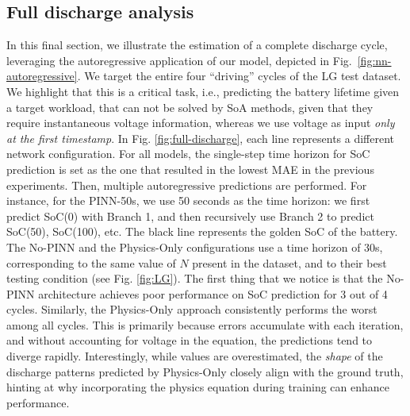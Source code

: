 \subsection{Full discharge analysis}
In this final section, we illustrate the estimation of a complete discharge cycle, leveraging the autoregressive application of our model, depicted in Fig.~\ref{fig:nn-autoregressive}. We target the entire four ``driving'' cycles of the LG test dataset. 
We highlight that this is a critical task, i.e., predicting the battery lifetime given a target workload, that can not be solved by SoA methods, given that they require instantaneous voltage information, whereas we use voltage as input \textit{only at the first timestamp}.
In Fig. \ref{fig:full-discharge}, each line represents a different network configuration. For all models, the single-step time horizon for SoC prediction is set as the one that resulted in the lowest MAE in the previous experiments. Then, multiple autoregressive predictions are performed. For instance, for the PINN-50s, we use 50 seconds as the time horizon: we first predict SoC(0) with Branch 1, and then recursively use Branch 2 to predict SoC(50), SoC(100), etc.
The black line represents the golden SoC of the battery. 
The No-PINN and the Physics-Only configurations use a time horizon of 30s, corresponding to the same value of $N$ present in the dataset, and to their best testing condition (see Fig. \ref{fig:LG}).
The first thing that we notice is that the No-PINN architecture achieves poor performance on SoC prediction for 3 out of 4 cycles. 
Similarly, the Physics-Only approach consistently performs the worst among all cycles. This is primarily because errors accumulate with each iteration, and without accounting for voltage in the equation, the predictions tend to diverge rapidly. Interestingly, while values are overestimated, the \textit{shape} of the discharge patterns predicted by Physics-Only closely align with the ground truth, hinting at why incorporating the physics equation during training can enhance performance.
